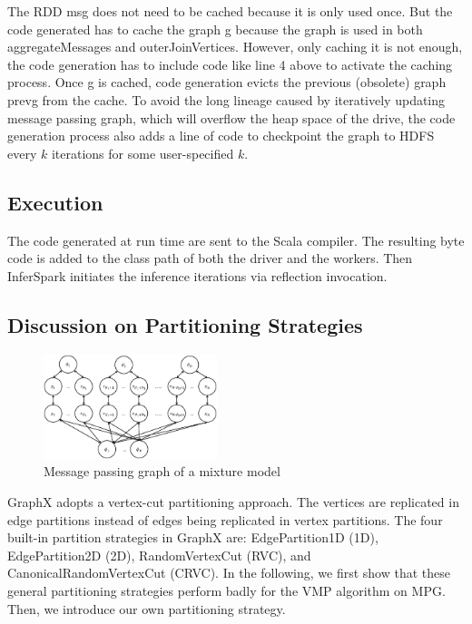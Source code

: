 The RDD {\sf msg} does not need to be cached because it is only used once. But
the code generated has to cache the graph {\sf g} because the graph is used in
both {\sf aggregateMessages} and {\sf outerJoinVertices}. However, only
caching it is not enough, the code generation has to include code like line 4
above to activate the caching process.  Once {\sf g} is cached, code
generation evicts the previous (obsolete) graph {\sf prevg} from the cache.
To avoid the long lineage caused by iteratively updating message passing
graph, which will overflow the heap space of the drive, the code generation
process also adds a line of code to checkpoint the graph to HDFS every $k$
iterations for some user-specified $k$.

\subsection{Execution}

The code generated at run time are sent to the Scala compiler. The resulting
byte code is added to the class path of both the driver and the workers. Then
InferSpark initiates the inference iterations via reflection invocation.


\subsection{Discussion on Partitioning Strategies}

\begin{figure}[h]
	\centering
	\includegraphics[width=0.45\textwidth]{figs/mixture_mpg.eps}
	\caption{Message passing graph of a mixture model}
	\label{fig:mixture_mpg}
\end{figure}

GraphX adopts a vertex-cut partitioning approach.
The vertices are replicated in edge partitions instead of edges being replicated in vertex
partitions. 
The four built-in partition
strategies in GraphX are: 
EdgePartition1D (1D),
EdgePartition2D  (2D),
RandomVertexCut (RVC), and
CanonicalRandomVertexCut (CRVC).
In the following, we first show that these general 
partitioning strategies perform badly for the VMP algorithm on MPG.
Then, we introduce our own partitioning strategy.


